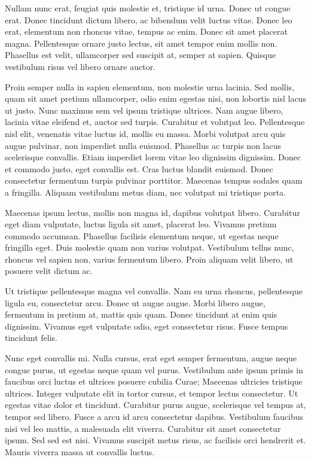 \documentclass{llncs}
\begin{document}
Nullam nunc erat, feugiat quis molestie et, tristique id urna. Donec ut congue erat. Donec tincidunt dictum libero, ac bibendum velit luctus vitae. Donec leo erat, elementum non rhoncus vitae, tempus ac enim. Donec sit amet placerat magna. Pellentesque ornare justo lectus, sit amet tempor enim mollis non. Phasellus est velit, ullamcorper sed suscipit at, semper at sapien. Quisque vestibulum risus vel libero ornare auctor.

Proin semper nulla in sapien elementum, non molestie urna lacinia. Sed mollis, quam sit amet pretium ullamcorper, odio enim egestas nisi, non lobortis nisl lacus ut justo. Nunc maximus sem vel ipsum tristique ultrices. Nam augue libero, lacinia vitae eleifend et, auctor sed turpis. Curabitur et volutpat leo. Pellentesque nisl elit, venenatis vitae luctus id, mollis eu massa. Morbi volutpat arcu quis augue pulvinar, non imperdiet nulla euismod. Phasellus ac turpis non lacus scelerisque convallis. Etiam imperdiet lorem vitae leo dignissim dignissim. Donec et commodo justo, eget convallis est. Cras luctus blandit euismod. Donec consectetur fermentum turpis pulvinar porttitor. Maecenas tempus sodales quam a fringilla. Aliquam vestibulum metus diam, nec volutpat mi tristique porta.

Maecenas ipsum lectus, mollis non magna id, dapibus volutpat libero. Curabitur eget diam vulputate, luctus ligula sit amet, placerat leo. Vivamus pretium commodo accumsan. Phasellus facilisis elementum neque, ut egestas neque fringilla eget. Duis molestie quam non varius volutpat. Vestibulum tellus nunc, rhoncus vel sapien non, varius fermentum libero. Proin aliquam velit libero, ut posuere velit dictum ac.

Ut tristique pellentesque magna vel convallis. Nam eu urna rhoncus, pellentesque ligula eu, consectetur arcu. Donec ut augue augue. Morbi libero augue, fermentum in pretium at, mattis quis quam. Donec tincidunt at enim quis dignissim. Vivamus eget vulputate odio, eget consectetur risus. Fusce tempus tincidunt felis.

Nunc eget convallis mi. Nulla cursus, erat eget semper fermentum, augue neque congue purus, ut egestas neque quam vel purus. Vestibulum ante ipsum primis in faucibus orci luctus et ultrices posuere cubilia Curae; Maecenas ultricies tristique ultrices. Integer vulputate elit in tortor cursus, et tempor lectus consectetur. Ut egestas vitae dolor et tincidunt. Curabitur purus augue, scelerisque vel tempus at, tempor sed libero. Fusce a arcu id arcu consectetur dapibus. Vestibulum faucibus nisi vel leo mattis, a malesuada elit viverra. Curabitur sit amet consectetur ipsum. Sed sed est nisi. Vivamus suscipit metus risus, ac facilisis orci hendrerit et. Mauris viverra massa ut convallis luctus.
\end{document}
